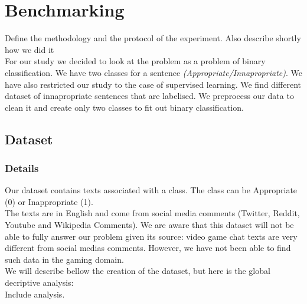 \documentclass[11pt,a4paper]{article}
\begin{document}
\pagebreak
\section{Benchmarking}
Define the methodology and the protocol of the experiment. Also describe shortly how we did it\\

For our study we decided to  look at the problem as a problem of binary classification. We have two classes for a sentence \textit{(Appropriate/Innapropriate)}. We have also restricted our study to the case of supervised learning. We find different dataset of innapropriate sentences that are labelised. We preprocess our data to clean it and create only two classes to fit out binary classification.


\subsection{Dataset}

\subsubsection{Details}

Our dataset contains texts associated with a class. The class can be Appropriate (0) or Inappropriate (1).\\
The texts are in English and come from social media comments (Twitter, Reddit, Youtube and Wikipedia Comments). We are aware that this dataset will not be able to fully answer our problem given its source: video game chat texts are very different from social medias comments. However, we have not been able to find such data in the gaming domain.\\
We will describe bellow the creation of the dataset, but here is the global decriptive analysis:\\
Include analysis.
\end{document}
